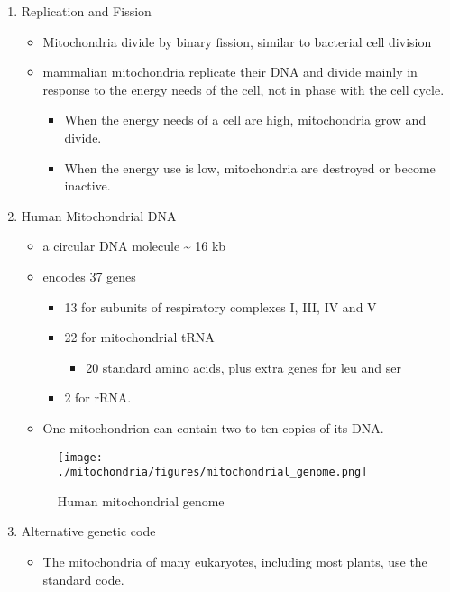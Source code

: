 \documentclass{scrartcl}
\begin{document}
\begin{enumerate}
\item Replication and Fission
\label{sec:org658a9e4}
\begin{itemize}
\item Mitochondria divide by binary fission, similar to bacterial cell division
\item mammalian mitochondria replicate their DNA and divide mainly in response
to the energy needs of the cell, not in phase with the cell cycle.
\begin{itemize}
\item When the energy needs of a cell are high, mitochondria grow and
divide.
\item When the energy use is low, mitochondria are destroyed
or become inactive.
\end{itemize}
\end{itemize}
\item Human Mitochondrial DNA
\label{sec:org2feee47}
\begin{itemize}
\item a circular DNA molecule \textasciitilde{} 16 kb
\item encodes 37 genes
\begin{itemize}
\item 13 for subunits of respiratory complexes I, III, IV and V
\item 22 for mitochondrial tRNA
\begin{itemize}
\item 20 standard amino acids, plus extra genes for leu and ser
\end{itemize}
\item 2 for rRNA.
\end{itemize}
\item One mitochondrion can contain two to ten copies of its DNA.
\end{itemize}

\begin{figure}[htbp]
\centering
\texttt{[image: ./mitochondria/figures/mitochondrial\_genome.png]}
\caption[mtdna]{\label{fig:orgb5b697e}
Human mitochondrial genome}
\end{figure}

\item Alternative genetic code
\label{sec:org0cc5d5e}
\begin{itemize}
\item The mitochondria of many eukaryotes, including most plants, use the
standard code.
\end{itemize}


\end{enumerate}
\end{document}
